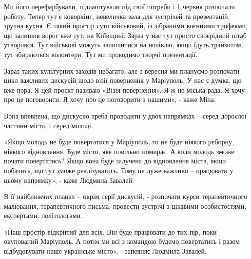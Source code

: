 Ми його перефарбували, підлаштували під свої потреби і 1 червня розпочали
роботу. Тепер тут є коворкінг, невеличка зала для зустрічей та презентацій,
зручна кухня. Є такий простір суто військовий, із зібраними воєнними трофеями,
що залишив ворог вже тут, на Київщині. Зараз у нас тут просто своєрідний штаб
утворився. Тут військові можуть залишитися на ночівлю, якщо їдуть транзитом,
тут збираються волонтери. Тут ми проводимо творчі презентації.

Зараз таких культурних заходів небагато, але з вересня ми плануємо розпочати
цикл важливих дискусій щодо візії повернення у Маріуполь. У нас є думка, що вже
пора. Я цей проєкт називаю «Візія повернення». Я ж не міська рада. Я хочу про
це поговорити. Я хочу про це поговорити з нашими», - каже Міла.

Вона впевнена, що дискусію треба проводити у двох напрямках – серед дорослої
частини міста, і серед молоді.

«Якщо молодь не буде повертатися у Маріуполь, то не буде ніякого реборну,
ніякого відновлення. Буде місто, яке повільно помирає. А коли молодь зможе
почати повертатись? Якщо вона буде залучена до відновлення міста, якщо
побачить, що тут зможе реалізуватись. Тому це дуже важливо – працювати у цьому
напрямку», - каже Людмила Завалей.

В її найближчих планах – окрім серії дискусій,  - розпочати курси
терапевтичного малювання, терапевтичного письма, провести зустрічі з цікавими
особистостями, експертами, політологами.

«Наш простір відкритий для всіх. Він буде працювати до тих пір, поки окупований
Маріуполь. А потім ми всі з командою будемо повертатись і разом відбудовувати
наше українське місто», - запевняє Людмила Завалей.
